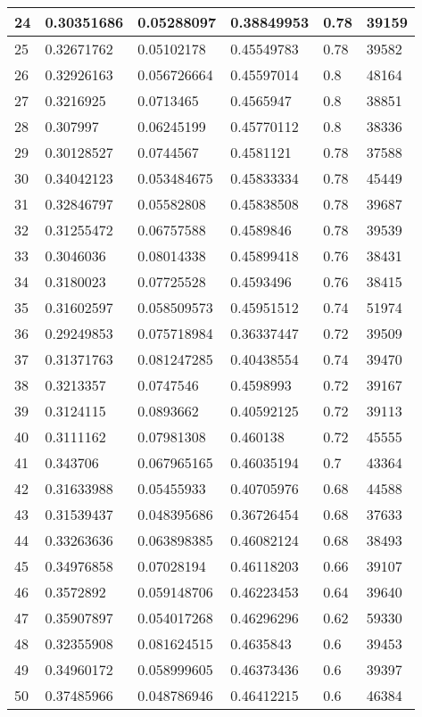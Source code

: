 \begin{longtable}{|l|l|l|l|l|l|}
24 & 0.30351686 & 0.05288097 & 0.38849953 & 0.78 & 39159 \\ \hline 
25 & 0.32671762 & 0.05102178 & 0.45549783 & 0.78 & 39582 \\ \hline 
26 & 0.32926163 & 0.056726664 & 0.45597014 & 0.8 & 48164 \\ \hline 
27 & 0.3216925 & 0.0713465 & 0.4565947 & 0.8 & 38851 \\ \hline 
28 & 0.307997 & 0.06245199 & 0.45770112 & 0.8 & 38336 \\ \hline 
29 & 0.30128527 & 0.0744567 & 0.4581121 & 0.78 & 37588 \\ \hline 
30 & 0.34042123 & 0.053484675 & 0.45833334 & 0.78 & 45449 \\ \hline 
31 & 0.32846797 & 0.05582808 & 0.45838508 & 0.78 & 39687 \\ \hline 
32 & 0.31255472 & 0.06757588 & 0.4589846 & 0.78 & 39539 \\ \hline 
33 & 0.3046036 & 0.08014338 & 0.45899418 & 0.76 & 38431 \\ \hline 
34 & 0.3180023 & 0.07725528 & 0.4593496 & 0.76 & 38415 \\ \hline 
35 & 0.31602597 & 0.058509573 & 0.45951512 & 0.74 & 51974 \\ \hline 
36 & 0.29249853 & 0.075718984 & 0.36337447 & 0.72 & 39509 \\ \hline 
37 & 0.31371763 & 0.081247285 & 0.40438554 & 0.74 & 39470 \\ \hline 
38 & 0.3213357 & 0.0747546 & 0.4598993 & 0.72 & 39167 \\ \hline 
39 & 0.3124115 & 0.0893662 & 0.40592125 & 0.72 & 39113 \\ \hline 
40 & 0.3111162 & 0.07981308 & 0.460138 & 0.72 & 45555 \\ \hline 
41 & 0.343706 & 0.067965165 & 0.46035194 & 0.7 & 43364 \\ \hline 
42 & 0.31633988 & 0.05455933 & 0.40705976 & 0.68 & 44588 \\ \hline 
43 & 0.31539437 & 0.048395686 & 0.36726454 & 0.68 & 37633 \\ \hline 
44 & 0.33263636 & 0.063898385 & 0.46082124 & 0.68 & 38493 \\ \hline 
45 & 0.34976858 & 0.07028194 & 0.46118203 & 0.66 & 39107 \\ \hline 
46 & 0.3572892 & 0.059148706 & 0.46223453 & 0.64 & 39640 \\ \hline 
47 & 0.35907897 & 0.054017268 & 0.46296296 & 0.62 & 59330 \\ \hline 
48 & 0.32355908 & 0.081624515 & 0.4635843 & 0.6 & 39453 \\ \hline 
49 & 0.34960172 & 0.058999605 & 0.46373436 & 0.6 & 39397 \\ \hline 
50 & 0.37485966 & 0.048786946 & 0.46412215 & 0.6 & 46384 \\ \hline 
\end{longtable}